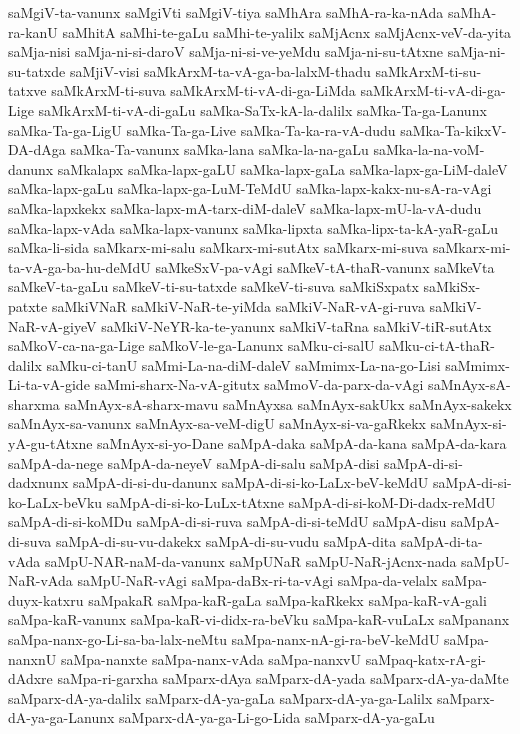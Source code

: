 {saMgiV-ta-vanunx
saMgiVti
saMgiV-tiya
saMhAra
saMhA-ra-ka-nAda
saMhA-ra-kanU
saMhitA
saMhi-te-gaLu
saMhi-te-yalilx
saMjAcnx
saMjAcnx-veV-da-yita
saMja-nisi
saMja-ni-si-daroV
saMja-ni-si-ve-yeMdu
saMja-ni-su-tAtxne
saMja-ni-su-tatxde
saMjiV-visi
saMkArxM-ta-vA-ga-ba-lalxM-thadu
saMkArxM-ti-su-tatxve
saMkArxM-ti-suva
saMkArxM-ti-vA-di-ga-LiMda
saMkArxM-ti-vA-di-ga-Lige
saMkArxM-ti-vA-di-gaLu
saMka-SaTx-kA-la-dalilx
saMka-Ta-ga-Lanunx
saMka-Ta-ga-LigU
saMka-Ta-ga-Live
saMka-Ta-ka-ra-vA-dudu
saMka-Ta-kikxV-DA-dAga
saMka-Ta-vanunx
saMka-lana
saMka-la-na-gaLu
saMka-la-na-voM-danunx
saMkalapx
saMka-lapx-gaLU
saMka-lapx-gaLa
saMka-lapx-ga-LiM-daleV
saMka-lapx-gaLu
saMka-lapx-ga-LuM-TeMdU
saMka-lapx-kakx-nu-sA-ra-vAgi
saMka-lapxkekx
saMka-lapx-mA-tarx-diM-daleV
saMka-lapx-mU-la-vA-dudu
saMka-lapx-vAda
saMka-lapx-vanunx
saMka-lipxta
saMka-lipx-ta-kA-yaR-gaLu
saMka-li-sida
saMkarx-mi-salu
saMkarx-mi-sutAtx
saMkarx-mi-suva
saMkarx-mi-ta-vA-ga-ba-hu-deMdU
saMkeSxV-pa-vAgi
saMkeV-tA-thaR-vanunx
saMkeVta
saMkeV-ta-gaLu
saMkeV-ti-su-tatxde
saMkeV-ti-suva
saMkiSxpatx
saMkiSx-patxte
saMkiVNaR
saMkiV-NaR-te-yiMda
saMkiV-NaR-vA-gi-ruva
saMkiV-NaR-vA-giyeV
saMkiV-NeYR-ka-te-yanunx
saMkiV-taRna
saMkiV-tiR-sutAtx
saMkoV-ca-na-ga-Lige
saMkoV-le-ga-Lanunx
saMku-ci-salU
saMku-ci-tA-thaR-dalilx
saMku-ci-tanU
saMmi-La-na-diM-daleV
saMmimx-La-na-go-Lisi
saMmimx-Li-ta-vA-gide
saMmi-sharx-Na-vA-gitutx
saMmoV-da-parx-da-vAgi
saMnAyx-sA-sharxma
saMnAyx-sA-sharx-mavu
saMnAyxsa
saMnAyx-sakUkx
saMnAyx-sakekx
saMnAyx-sa-vanunx
saMnAyx-sa-veM-digU
saMnAyx-si-va-gaRkekx
saMnAyx-si-yA-gu-tAtxne
saMnAyx-si-yo-Dane
saMpA-daka
saMpA-da-kana
saMpA-da-kara
saMpA-da-nege
saMpA-da-neyeV
saMpA-di-salu
saMpA-disi
saMpA-di-si-dadxnunx
saMpA-di-si-du-danunx
saMpA-di-si-ko-LaLx-beV-keMdU
saMpA-di-si-ko-LaLx-beVku
saMpA-di-si-ko-LuLx-tAtxne
saMpA-di-si-koM-Di-dadx-reMdU
saMpA-di-si-koMDu
saMpA-di-si-ruva
saMpA-di-si-teMdU
saMpA-disu
saMpA-di-suva
saMpA-di-su-vu-dakekx
saMpA-di-su-vudu
saMpA-dita
saMpA-di-ta-vAda
saMpU-NAR-naM-da-vanunx
saMpUNaR
saMpU-NaR-jAcnx-nada
saMpU-NaR-vAda
saMpU-NaR-vAgi
saMpa-daBx-ri-ta-vAgi
saMpa-da-velalx
saMpa-duyx-katxru
saMpakaR
saMpa-kaR-gaLa
saMpa-kaRkekx
saMpa-kaR-vA-gali
saMpa-kaR-vanunx
saMpa-kaR-vi-didx-ra-beVku
saMpa-kaR-vuLaLx
saMpananx
saMpa-nanx-go-Li-sa-ba-lalx-neMtu
saMpa-nanx-nA-gi-ra-beV-keMdU
saMpa-nanxnU
saMpa-nanxte
saMpa-nanx-vAda
saMpa-nanxvU
saMpaq-katx-rA-gi-dAdxre
saMpa-ri-garxha
saMparx-dAya
saMparx-dA-yada
saMparx-dA-ya-daMte
saMparx-dA-ya-dalilx
saMparx-dA-ya-gaLa
saMparx-dA-ya-ga-Lalilx
saMparx-dA-ya-ga-Lanunx
saMparx-dA-ya-ga-Li-go-Lida
saMparx-dA-ya-gaLu
}
